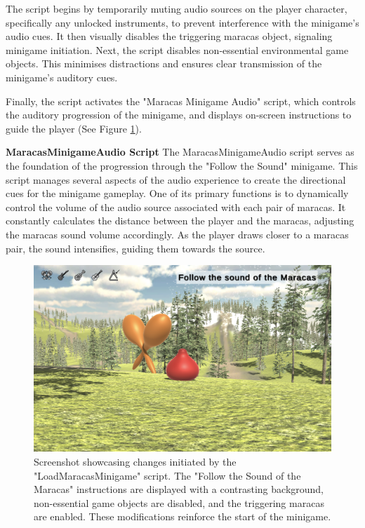 \documentclass{l4proj}
\begin{document}
The script begins by temporarily muting audio sources on the player character, specifically any unlocked instruments, to prevent interference with the minigame's audio cues. It then visually disables the triggering maracas object, signaling minigame initiation. Next, the script disables non-essential environmental game objects. This minimises distractions and ensures clear transmission of the minigame's auditory cues.

Finally, the script activates the "Maracas Minigame Audio" script, which controls the auditory progression of the minigame, and displays on-screen instructions to guide the player (See Figure \ref{fig:maracas_setup}).
\newline

\textbf{MaracasMinigameAudio Script} \newline
The MaracasMinigameAudio script serves as the foundation of the progression through the "Follow the Sound" minigame. This script manages several aspects of the audio experience to create the directional cues for the minigame gameplay. One of its primary functions is to dynamically control the volume of the audio source associated with each pair of maracas. It constantly calculates the distance between the player and the maracas, adjusting the maracas sound volume accordingly. As the player draws closer to a maracas pair, the sound intensifies, guiding them towards the source.

\begin{figure}[h]
 \centering
 \includegraphics[width=0.7\linewidth]{dissertation/images/Maracas_Setup.png} 
 \caption{Screenshot showcasing changes initiated by the "LoadMaracasMinigame" script. The "Follow the Sound of the Maracas" instructions are displayed with a contrasting background, non-essential game objects are disabled, and the triggering maracas are enabled. These modifications reinforce the start of the minigame.} 
 \label{fig:maracas_setup} 
\end{figure}
\end{document}
